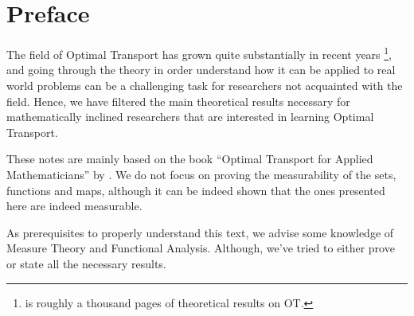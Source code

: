 \newpage
\chapter*{Preface}

The field of Optimal Transport has grown quite substantially in recent years
\footnote{\citet{villani2008optimal} is roughly a thousand pages of theoretical results on OT.},
and going through the theory in order understand how it can be applied to real world problems can
be a challenging task for researchers not acquainted with the field.
Hence, we have filtered the main theoretical
results necessary for mathematically inclined researchers that are interested in learning
Optimal Transport.

These notes are mainly based on the book
``Optimal Transport for Applied Mathematicians'' by
\citet{santambrogio2015optimal}. We do not focus
on proving the measurability of the sets, functions and maps, although it can be indeed shown
that the ones presented here are indeed measurable.

As prerequisites to properly understand this text, we advise some knowledge of
Measure Theory and Functional Analysis. Although, we've tried to either prove or state
all the necessary results.


